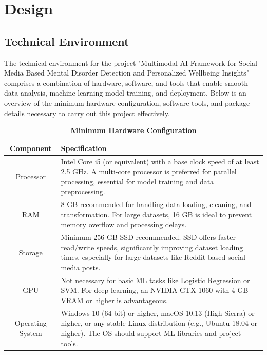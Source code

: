 
\section{Design}

\subsection{Technical Environment}
\noindent
The technical environment for the project "Multimodal AI Framework for Social Media Based Mental Disorder Detection and Personalized Wellbeing Insights" comprises a combination of hardware, software, and tools that enable smooth data analysis, machine learning model training, and deployment. Below is an overview of the minimum hardware configuration, software tools, and package details necessary to carry out this project effectively. 

\begin{table}[h]
    \centering
    \renewcommand{\arraystretch}{1.2}
    \begin{tabular}{|c|p{12cm}|}
        \hline
        \rowcolor{lightestgray}
        \textbf{Component} & \textbf{Specification} \\
        \hline
        Processor & Intel Core i5 (or equivalent) with a base clock speed of at least 2.5 GHz. A multi-core processor is preferred for parallel processing, essential for model training and data preprocessing. \\
        \hline
        RAM & 8 GB recommended for handling data loading, cleaning, and transformation. For large datasets, 16 GB is ideal to prevent memory overflow and processing delays. \\
        \hline
        Storage & Minimum 256 GB SSD recommended. SSD offers faster read/write speeds, significantly improving dataset loading times, especially for large datasets like Reddit-based social media posts. \\
        \hline
        GPU & Not necessary for basic ML tasks like Logistic Regression or SVM. For deep learning, an NVIDIA GTX 1060 with 4 GB VRAM or higher is advantageous. \\
        \hline
        Operating System & Windows 10 (64-bit) or higher, macOS 10.13 (High Sierra) or higher, or any stable Linux distribution (e.g., Ubuntu 18.04 or higher). The OS should support ML libraries and project tools. \\
        \hline
    \end{tabular}
    \caption*{\textbf{Minimum Hardware Configuration}}
\end{table}


